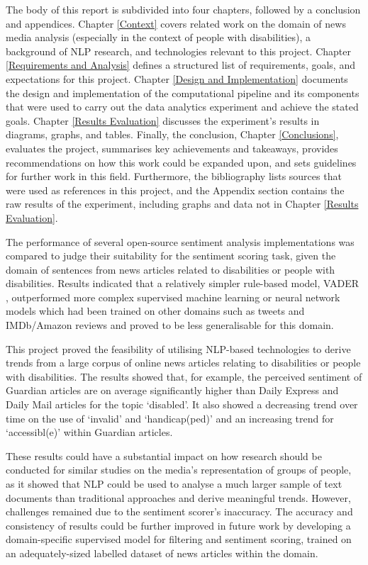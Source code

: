 \documentclass{report}
\begin{document}
The body of this report is subdivided into four chapters, followed by a conclusion and appendices.
Chapter \ref{Context} covers related work on the domain of news media analysis (especially in the context of people with disabilities), a background of NLP research, and technologies relevant to this project.
Chapter \ref{Requirements and Analysis} defines a structured list of requirements, goals, and expectations for this project.
Chapter \ref{Design and Implementation} documents the design and implementation of the computational pipeline and its components that were used to carry out the data analytics experiment and achieve the stated goals.
Chapter \ref{Results Evaluation} discusses the experiment's results in diagrams, graphs, and tables.
Finally, the conclusion, Chapter \ref{Conclusions}, evaluates the project, summarises key achievements and takeaways, provides recommendations on how this work could be expanded upon, and sets guidelines for further work in this field.
Furthermore, the bibliography lists sources that were used as references in this project, and the Appendix section contains the raw results of the experiment, including graphs and data not in Chapter \ref{Results Evaluation}.

The performance of several open-source sentiment analysis implementations was compared to judge their suitability for the sentiment scoring task, given the domain of sentences from news articles related to disabilities or people with disabilities.
Results indicated that a relatively simpler rule-based model, VADER \cite{VADER}, outperformed more complex supervised machine learning or neural network models which had been trained on other domains such as tweets and IMDb/Amazon reviews and proved to be less generalisable for this domain.

This project proved the feasibility of utilising NLP-based technologies to derive trends from a large corpus of online news articles relating to disabilities or people with disabilities.
The results showed that, for example, the perceived sentiment of Guardian articles are on average significantly higher than Daily Express and Daily Mail articles for the topic `disabled'.
It also showed a decreasing trend over time on the use of `invalid' and `handicap(ped)' and an increasing trend for `accessibl(e)' within Guardian articles.

These results could have a substantial impact on how research should be conducted for similar studies on the media's representation of groups of people, as it showed that NLP could be used to analyse a much larger sample of text documents than traditional approaches and derive meaningful trends.
However, challenges remained due to the sentiment scorer's inaccuracy.
The accuracy and consistency of results could be further improved in future work by developing a domain-specific supervised model for filtering and sentiment scoring, trained on an adequately-sized labelled dataset of news articles within the domain.
\end{document}
